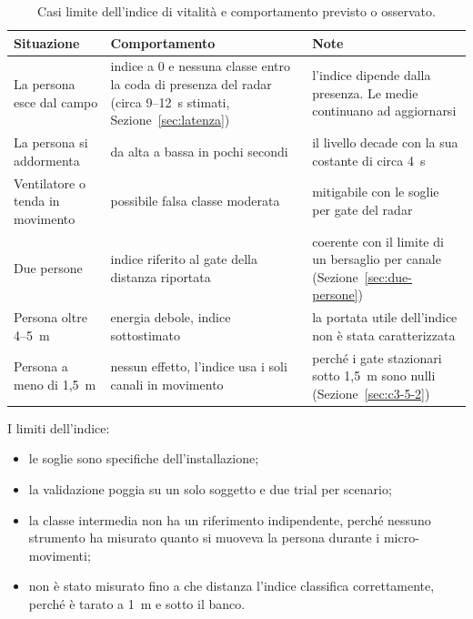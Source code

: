 \begin{table}[htbp]
\centering
\caption{Casi limite dell'indice di vitalità e comportamento previsto o osservato.}
\label{tab:vitalita-casilimite}
\small
\begin{tabularx}{\linewidth}{@{}XXX@{}}
\toprule
\textbf{Situazione} & \textbf{Comportamento} & \textbf{Note} \\
\midrule
La persona esce dal campo & indice a 0 e nessuna classe entro la coda di presenza
  del radar (circa 9--12~s stimati, Sezione~\ref{sec:latenza}) & l'indice dipende dalla presenza. Le medie continuano ad aggiornarsi \\
La persona si addormenta & da alta a bassa in pochi secondi & il livello decade con la sua costante di circa 4~s \\
Ventilatore o tenda in movimento & possibile falsa classe moderata & mitigabile con le soglie per gate del radar \\
Due persone & indice riferito al gate della distanza riportata & coerente con il
  limite di un bersaglio per canale (Sezione~\ref{sec:due-persone}) \\
Persona oltre 4--5~m & energia debole, indice sottostimato & la portata utile
  dell'indice non è stata caratterizzata \\
Persona a meno di 1,5~m & nessun effetto, l'indice usa i soli canali in movimento &
  perché i gate stazionari sotto 1,5~m sono nulli (Sezione~\ref{sec:c3-5-2}) \\
\bottomrule
\end{tabularx}
\end{table}

I limiti dell'indice:

\begin{itemize}
    \item le soglie sono specifiche dell'installazione;

    \item la validazione poggia su un solo soggetto e due trial per scenario;

    \item la classe intermedia non ha un riferimento indipendente, perché nessuno strumento ha misurato quanto si muoveva la persona durante i micro-movimenti;

    \item non è stato misurato fino a che distanza l'indice classifica correttamente, perché è tarato a 1~m e sotto il banco.
\end{itemize}


